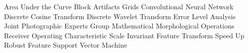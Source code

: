          {Area  Under the Curve}
         {Block Artifacts Grids}
         {Convolutional Neural Network}
         {Discrete Cosine Transform}
         {Discrete Wavelet Transform}
         {Error Level Analysis}
       {Joint Photographic Experts Group}
         {Mathematical Morphological Operations}
         {Receiver Operating Characteristic}
       {Scale Invariant Feature Transform}
       {Speed Up Robust Feature}
         {Support Vector Machine}








